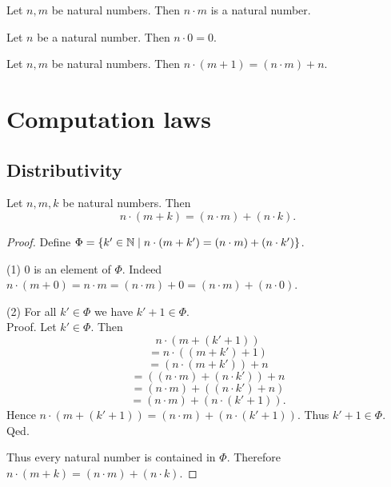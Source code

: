 \documentclass[../arithmetic.tex]{subfiles}
\begin{document}
  \begin{forthel}
    \begin{lemma}
      Let $n, m$ be natural numbers.
      Then $n \cdot m$ is a natural number.
    \end{lemma}
  \end{forthel}

  \begin{forthel}
    \begin{lemma}
      Let $n$ be a natural number.
      Then $n \cdot 0 = 0$.
    \end{lemma}
  \end{forthel}

  \begin{forthel}
    \begin{lemma}
      Let $n, m$ be natural numbers.
      Then $n \cdot (m \plus 1) = (n \cdot m) \plus n$.
    \end{lemma}
  \end{forthel}


  \section{Computation laws}

  \subsection*{Distributivity}

  \begin{forthel}
    \begin{proposition}
      Let $n, m, k$ be natural numbers.
      Then \[ n \cdot (m \plus k) = (n \cdot m) \plus (n \cdot k). \]
    \end{proposition}
    \begin{proof}
      Define $\Phi = \{ k' \in \mathbb{N} \mid n \cdot (m + k') =
      (n \cdot m) + (n \cdot k') \}$.

      (1) $0$ is an element of $\Phi$.
      Indeed $n \cdot (m \plus 0)
        = n \cdot m
        = (n \cdot m) \plus 0
        = (n \cdot m) \plus (n \cdot 0)$.

      (2) For all $k' \in \Phi$ we have $k' \plus 1 \in \Phi$. \\
      Proof.
        Let $k'\in \Phi$.
        Then
        \[  n \cdot (m \plus (k' \plus 1))                  \]
        \[    = n \cdot ((m \plus k') \plus 1)              \]
        \[    = (n \cdot (m \plus k')) \plus n              \]
        \[    = ((n \cdot m) \plus (n \cdot k')) \plus n    \]
        \[    = (n \cdot m) \plus ((n \cdot k') \plus n)    \]
        \[    = (n \cdot m) \plus (n \cdot (k' \plus 1)).   \]
        Hence $n \cdot (m \plus (k' \plus 1)) = (n \cdot m) \plus (n \cdot (k' \plus 1))$.
        Thus $k' \plus 1 \in \Phi$.
      Qed.

      Thus every natural number is contained in $\Phi$.
      Therefore $n \cdot (m \plus k) = (n \cdot m) \plus (n \cdot k)$.
    \end{proof}
  \end{forthel}
\end{document}
